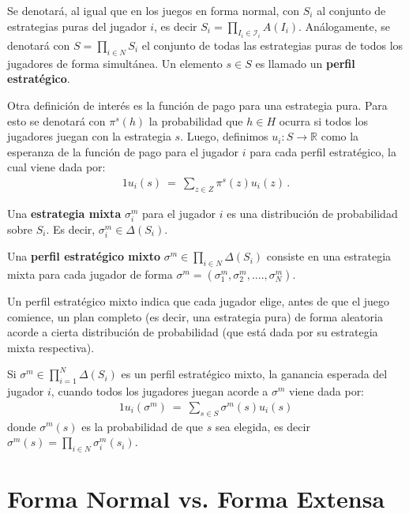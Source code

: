 Se denotará, al igual que en los juegos en forma normal, con $S_i$ al conjunto de estrategias puras del jugador $i$, es decir $S_i=\prod_{I_i \in \mathcal{I}_i} A(I_i)$. Análogamente, se denotará con $S = \prod_{i \in N} S_i$ el conjunto de todas las estrategias puras de todos los jugadores de forma simultánea. Un elemento $s \in S$ es llamado un \textbf{perfil estratégico}.

Otra definición de interés es la función de pago para una estrategia pura. Para esto se denotará con $\pi^s(h)$ la probabilidad que $h \in H $ ocurra si todos los jugadores juegan con la estrategia $s$. Luego, definimos $u_i : S \rightarrow \mathbb{R}$ como la esperanza de la función de pago para el jugador $i$ para cada perfil estratégico, la cual viene dada por:
\begin{alignat}{1}
\label{eq:funcion-pago-fe}
u_i(s)\ =\ \sum_{z \in Z} \pi^s(z) u_i(z) \,.
\end{alignat} 

\begin{definition}
\label{def:estrategia-mixta-fe}
Una \textbf{estrategia mixta} $\sigma^m_i$ para el jugador $i$ es una distribución de probabilidad sobre $S_i$. Es decir, $\sigma_i^m \in \Delta(S_i)$.
\end{definition}

\begin{definition}
Una \textbf{perfil estratégico mixto} $\sigma^m \in \prod_{i \in N} \Delta(S_i)$ consiste en una estrategia mixta para cada jugador de forma $\sigma^m = (\sigma_1^m, \sigma_2^m, ...., \sigma_N^m)$.
\end{definition}

Un perfil estratégico mixto indica que cada jugador elige, antes de que el juego comience, un plan completo (es decir, una estrategia pura) de forma aleatoria acorde a cierta distribución de probabilidad (que está dada por su estrategia mixta respectiva).

Si $\sigma^m \in \prod_{i = 1}^N \Delta(S_i)$ es un perfil estratégico mixto, la ganancia esperada del jugador $i$, cuando todos los jugadores juegan acorde a $\sigma^m$ viene dada por:
\begin{alignat}{1}
u_i(\sigma^m)\ =\ \sum_{s \in S} \sigma^m(s)u_i(s)
\end{alignat}
donde $\sigma^m(s)$ es la probabilidad de que $s$ sea elegida, es decir $\sigma^m(s) = \prod_{i \in N} \sigma_i^m(s_i)$.

\section{Forma Normal vs. Forma Extensa}
\label{section:normal-extensiva}

